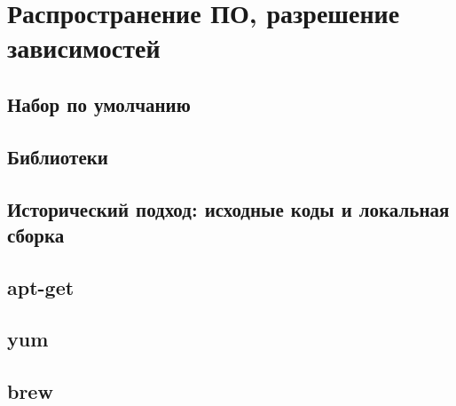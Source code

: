 \section{Распространение ПО, разрешение зависимостей}
\subsection{Набор по умолчанию}
\subsection{Библиотеки}
\subsection{Исторический подход: исходные коды и локальная сборка}
\subsection{apt-get}
\subsection{yum}
\subsection{brew}
\newpage
